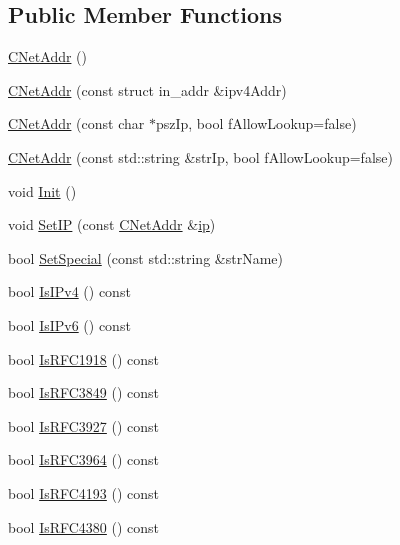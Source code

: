 \subsection*{Public Member Functions}
\begin{DoxyCompactItemize}
\item 
\hyperlink{class_c_net_addr_ad997a7ab057fbeab1dd6601135f8e02d}{C\+Net\+Addr} ()
\item 
\hyperlink{class_c_net_addr_a0af492cd8aca9bbaa3392cdbfbb55681}{C\+Net\+Addr} (const struct in\+\_\+addr \&ipv4\+Addr)
\item 
\hyperlink{class_c_net_addr_a3549332f92d95ccadf262bdce9f4eacf}{C\+Net\+Addr} (const char $\ast$psz\+Ip, bool f\+Allow\+Lookup=false)
\item 
\hyperlink{class_c_net_addr_ae237602be0e4bce6ff31061270371144}{C\+Net\+Addr} (const std\+::string \&str\+Ip, bool f\+Allow\+Lookup=false)
\item 
void \hyperlink{class_c_net_addr_adab412fbc5a9203bea90ae173996ab10}{Init} ()
\item 
void \hyperlink{class_c_net_addr_a1c6087345e5ca07a151451cd6deb974f}{Set\+I\+P} (const \hyperlink{class_c_net_addr}{C\+Net\+Addr} \&\hyperlink{class_c_net_addr_acff7ce68f33f8dfbfe6d79d80928d417}{ip})
\item 
bool \hyperlink{class_c_net_addr_aa3e44dfd064d9d8da1cb48cdcb7dd231}{Set\+Special} (const std\+::string \&str\+Name)
\item 
bool \hyperlink{class_c_net_addr_a16ff4478f02f06f5a9a038a24d5da2f9}{Is\+I\+Pv4} () const 
\item 
bool \hyperlink{class_c_net_addr_a0edb022cd6a186de8099799415409d57}{Is\+I\+Pv6} () const 
\item 
bool \hyperlink{class_c_net_addr_a81b190a7e0b05b93bf3097ba43e5cec1}{Is\+R\+F\+C1918} () const 
\item 
bool \hyperlink{class_c_net_addr_a639dff0ffea6ad930353784686def39b}{Is\+R\+F\+C3849} () const 
\item 
bool \hyperlink{class_c_net_addr_a3d8e5495fd3a2f92bedf272452a2d4b0}{Is\+R\+F\+C3927} () const 
\item 
bool \hyperlink{class_c_net_addr_a312065a9243977a602412665d6148f26}{Is\+R\+F\+C3964} () const 
\item 
bool \hyperlink{class_c_net_addr_ac47bf0c27f8026497b1933393a6570ba}{Is\+R\+F\+C4193} () const 
\item 
bool \hyperlink{class_c_net_addr_afc6e370bb97c97f83260bba898ec4731}{Is\+R\+F\+C4380} () const 
\item 

\end{DoxyCompactItemize}

